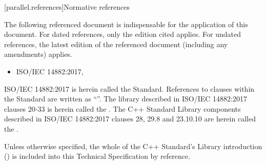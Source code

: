 
[parallel.references]{Normative references}

\pnum
The following referenced document is indispensable for the
application of this document. For dated references, only the
edition cited applies. For undated references, the latest edition
of the referenced document (including any amendments) applies.

\begin{itemize}
\item ISO/IEC 14882:2017,
\end{itemize}

\pnum
ISO/IEC 14882:2017 is herein called the \Cpp Standard.
References to clauses within the \Cpp Standard are written as ``''.
The library described in ISO/IEC 14882:2017 clauses 20-33 is herein called the .
The C++ Standard Library components described in ISO/IEC 14882:2017 clauses 28, 29.8 and 23.10.10 are herein called the .

\pnum
Unless otherwise specified, the whole of the C++ Standard's Library introduction () is included into this Technical Specification by reference.
